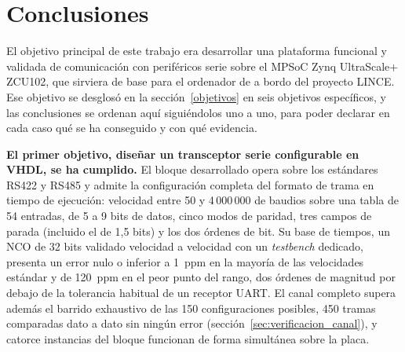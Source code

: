 \section{Conclusiones}

El objetivo principal de este trabajo era desarrollar una plataforma funcional y validada de
comunicación con periféricos serie sobre el MPSoC Zynq UltraScale+ ZCU102, que sirviera de base
para el ordenador de a bordo del proyecto LINCE. Ese objetivo se desglosó en la
sección~\ref{objetivos} en seis objetivos específicos, y las conclusiones se ordenan aquí
siguiéndolos uno a uno, para poder declarar en cada caso qué se ha conseguido y con qué evidencia.

\textbf{El primer objetivo, diseñar un transceptor serie configurable en VHDL, se ha cumplido.}
El bloque desarrollado opera sobre los estándares RS422 y RS485 y admite la configuración completa
del formato de trama en tiempo de ejecución: velocidad entre 50 y 4\,000\,000 de baudios sobre una
tabla de 54 entradas, de 5 a 9 bits de datos, cinco modos de paridad, tres campos de parada
(incluido el de 1,5 bits) y los dos órdenes de bit. Su base de tiempos, un NCO de 32 bits validado
velocidad a velocidad con un \textit{testbench} dedicado, presenta un error nulo o inferior a
1~ppm en la mayoría de las velocidades estándar y de 120~ppm en el peor punto del rango, dos
órdenes de magnitud por debajo de la tolerancia habitual de un receptor UART. El canal completo
supera además el barrido exhaustivo de las 150 configuraciones posibles, 450 tramas comparadas dato
a dato sin ningún error (sección~\ref{sec:verificacion_canal}), y catorce instancias del bloque
funcionan de forma simultánea sobre la placa.

